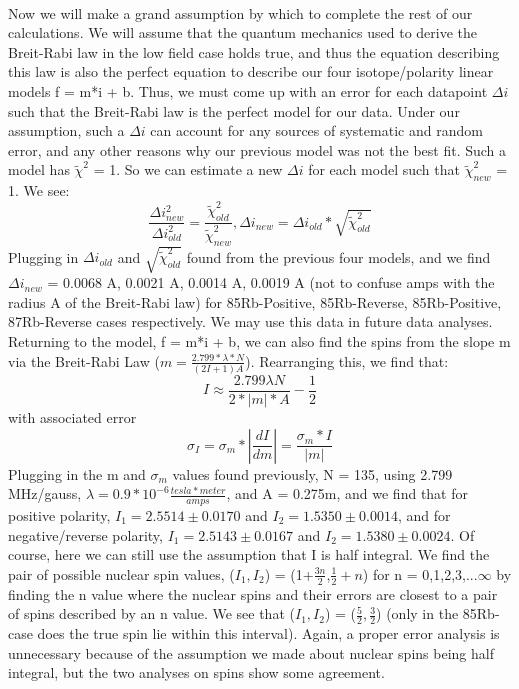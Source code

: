 \documentclass{article}
\begin{document}
\\\indent Now we will make a grand assumption by which to complete the rest of our calculations. We will assume that the quantum mechanics used to derive the Breit-Rabi law in the low field case holds true, and thus the equation describing this law is also the perfect equation to describe our four isotope/polarity linear models f = m*i + b. Thus, we must come up with an error for each datapoint $\Delta i$ such that the Breit-Rabi law is the perfect model for our data. Under our assumption, such a $\Delta i$ can account for any sources of systematic and random error, and any other reasons why our previous model was not the best fit. Such a model has $\tilde{\chi}^2$ = 1. So we can estimate a new $\Delta i$ for each model such that $\tilde{\chi}_{new}^2$ = 1. We see:
\begin{equation}
      \frac{\Delta i_{new}^2}{\Delta i_{old}^2} = \frac{\tilde{\chi}_{old}^2}{\tilde{\chi}_{new}^2}, \Delta i_{new} = \Delta i_{old} * \sqrt{\tilde{\chi}_{old}^2}
\end{equation}
Plugging in $\Delta i_{old}$ and $\sqrt{\tilde{\chi}_{old}^2}$ found from the previous four models, and we find $\Delta i_{new}$ = 0.0068 A, 0.0021 A, 0.0014 A, 0.0019 A (not to confuse amps with the radius A of the Breit-Rabi law) for 85Rb-Positive, 85Rb-Reverse, 85Rb-Positive, 87Rb-Reverse cases respectively. We may use this data in future data analyses. Returning to the model, f = m*i + b, we can also find the spins from the slope m via the Breit-Rabi Law ($m = \frac{2.799*\lambda * N}{(2I+1)A}$). Rearranging this, we find that:
\begin{equation}
      I \approx \frac{2.799 \lambda N}{2*|m|*A} - \frac{1}{2}
\end{equation}
with associated error
\begin{equation}
      \sigma_I = \sigma_m * |\frac{dI}{dm}| = \frac{\sigma_m*I}{|m|}
\end{equation}
Plugging in the m and $\sigma_m$ values found previously, N = 135, using 2.799 MHz/gauss, $\lambda = 0.9 * 10^{-6} \frac{tesla*meter}{amps}$, and A = 0.275m, and we find that for positive polarity, $I_1 = 2.5514\pm0.0170$ and $I_2 = 1.5350\pm0.0014$, and for negative/reverse polarity, $I_1 = 2.5143\pm0.0167$ and $I_2 = 1.5380\pm0.0024$. Of course, here we can still use the assumption that I is half integral. We find the pair of possible nuclear spin values, ($I_1,I_2$) = (1+$\frac{3n}{2}$,$\frac{1}{2}+n$) for n = 0,1,2,3,...$\infty$ by finding the n value where the nuclear spins and their errors are closest to a pair of spins described by an n value. We see that ($I_1,I_2$) = ($\frac{5}{2},\frac{3}{2}$) (only in the 85Rb- case does the true spin lie within this interval). Again, a proper error analysis is unnecessary because of the assumption we made about nuclear spins being half integral, but the two analyses on spins show some agreement. %
\end{document}

